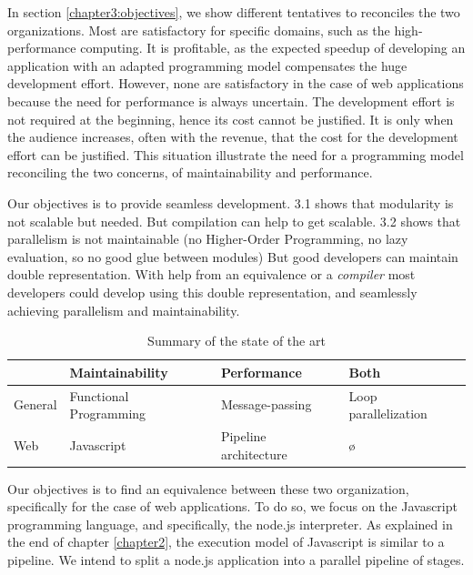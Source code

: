 In section \ref{chapter3:objectives}, we show different tentatives to reconciles the two organizations.
Most are satisfactory for specific domains, such as the high-performance computing.
It is profitable, as the expected speedup of developing an application with an adapted programming model compensates the huge development effort.
However, none are satisfactory in the case of web applications because the need for performance is always uncertain.
The development effort is not required at the beginning, hence its cost cannot be justified.
It is only when the audience increases, often with the revenue, that the cost for the development effort can be justified.
This situation illustrate the need for a programming model reconciling the two concerns, of maintainability and performance.


Our objectives is to provide seamless development.
3.1 shows that modularity is not scalable but needed.
But compilation can help to get scalable.
3.2 shows that parallelism is not maintainable (no Higher-Order Programming, no lazy evaluation, so no good glue between modules)
But good developers can maintain double representation.
With help from an equivalence or a \textit{compiler} most developers could develop using this double representation, and seamlessly achieving parallelism and maintainability.

\begin{table}
\begin{tabular}{l|l|l|l}
             & Maintainability         & Performance           & Both\\\hline
General      & Functional Programming  & Message-passing       & Loop parallelization\\
Web          & Javascript              & Pipeline architecture & ø
\end{tabular}
\caption{Summary of the state of the art}
\label{tab:chapter3:objectives:summary}
\end{table}

Our objectives is to find an equivalence between these two organization, specifically for the case of web applications.
To do so, we focus on the Javascript programming language, and specifically, the node.js interpreter.
As explained in the end of chapter \ref{chapter2}, the execution model of Javascript is similar to a pipeline.
We intend to split a node.js application into a parallel pipeline of stages.

